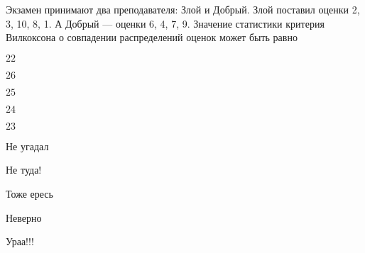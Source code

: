 
\begin{question}
Экзамен принимают два преподавателя: Злой и Добрый. Злой поставил оценки
2, 3, 10, 8, 1. А Добрый --- оценки 6, 4, 7, 9. Значение статистики
критерия Вилкоксона о совпадении распределений оценок может быть равно
\begin{answerlist}
  \item \(22\)
  \item \(26\)
  \item \(25\)
  \item \(24\)
  \item \(23\)
\end{answerlist}
\end{question}

\begin{solution}
\begin{answerlist}
  \item Не угадал
  \item Не туда!
  \item Тоже ересь
  \item Неверно
  \item Ураа!!!
\end{answerlist}
\end{solution}

